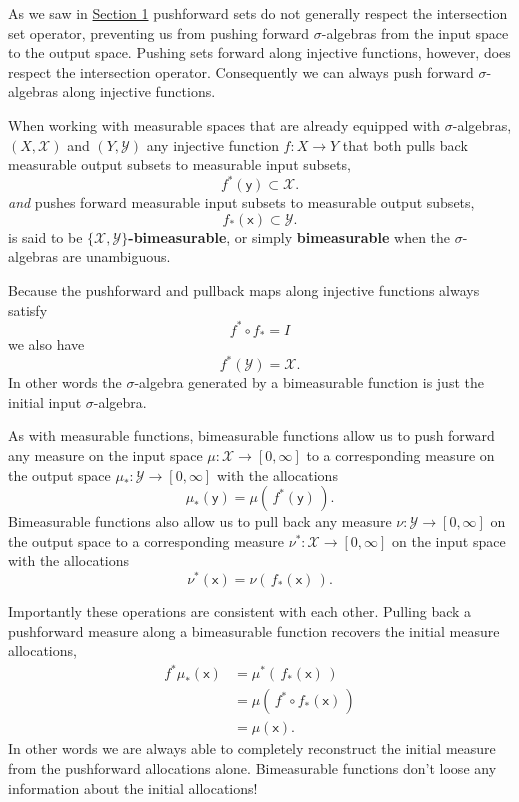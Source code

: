 \documentclass[
  letterpaper,
  DIV=11,
  numbers=noendperiod]{scrartcl}
\begin{document}
As we saw in \href{@sec:pushforward-sets}{Section 1} pushforward sets do
not generally respect the intersection set operator, preventing us from
pushing forward \(\sigma\)-algebras from the input space to the output
space. Pushing sets forward along injective functions, however, does
respect the intersection operator. Consequently we can always push
forward \(\sigma\)-algebras along injective functions.

When working with measurable spaces that are already equipped with
\(\sigma\)-algebras, \((X, \mathcal{X})\) and \((Y, \mathcal{Y})\) any
injective function \(f : X \rightarrow Y\) that both pulls back
measurable output subsets to measurable input subsets, \[
f^{*}(\mathsf{y}) \subset \mathcal{X}.
\] \emph{and} pushes forward measurable input subsets to measurable
output subsets, \[
f_{*}(\mathsf{x}) \subset \mathcal{Y}.
\] is said to be
\textbf{\(\{ \mathcal{X}, \mathcal{Y} \}\)-bimeasurable}, or simply
\textbf{bimeasurable} when the \(\sigma\)-algebras are unambiguous.

Because the pushforward and pullback maps along injective functions
always satisfy \[
f^{*} \circ f_{*} = I
\] we also have \[
f^{*}(\mathcal{Y}) = \mathcal{X}.
\] In other words the \(\sigma\)-algebra generated by a bimeasurable
function is just the initial input \(\sigma\)-algebra.

As with measurable functions, bimeasurable functions allow us to push
forward any measure on the input space
\(\mu : \mathcal{X} \rightarrow [0, \infty]\) to a corresponding measure
on the output space \(\mu_{*} : \mathcal{Y} \rightarrow [0, \infty]\)
with the allocations \[
\mu_{*}(\mathsf{y}) = \mu( \, f^{*}(\mathsf{y}) \, ).
\] Bimeasurable functions also allow us to pull back any measure
\(\nu : \mathcal{Y} \rightarrow [0, \infty]\) on the output space to a
corresponding measure \(\nu^{*} : \mathcal{X} \rightarrow [0, \infty]\)
on the input space with the allocations \[
\nu^{*}(\mathsf{x}) = \nu( \, f_{*}(\mathsf{x}) \, ).
\]

Importantly these operations are consistent with each other. Pulling
back a pushforward measure along a bimeasurable function recovers the
initial measure allocations, \begin{align*}
f^{*} \mu_{*} (\mathsf{x})
&=
\mu^{*}( \, f_{*}(\mathsf{x}) \, )
\\
&=
\mu( \, f^{*} \circ f_{*}(\mathsf{x}) \, )
\\
&=
\mu( \mathsf{x} ).
\end{align*} In other words we are always able to completely reconstruct
the initial measure from the pushforward allocations alone. Bimeasurable
functions don't loose any information about the initial allocations!
\end{document}
